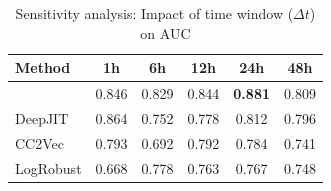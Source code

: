 \begin{table}[t]
\centering
\caption{Sensitivity analysis: Impact of time window ($\Delta t$) on AUC}
\label{tab:sensitivity}
\begin{tabular}{lccccc}
\toprule
\textbf{Method} & \textbf{1h} & \textbf{6h} & \textbf{12h} & \textbf{24h} & \textbf{48h} \\
\midrule
\textbf{\toolname{}} & 0.846 & 0.829 & 0.844 & \textbf{0.881} & 0.809 \\
DeepJIT & 0.864 & 0.752 & 0.778 & 0.812 & 0.796 \\
CC2Vec & 0.793 & 0.692 & 0.792 & 0.784 & 0.741 \\
LogRobust & 0.668 & 0.778 & 0.763 & 0.767 & 0.748 \\
\bottomrule
\end{tabular}
\end{table}
